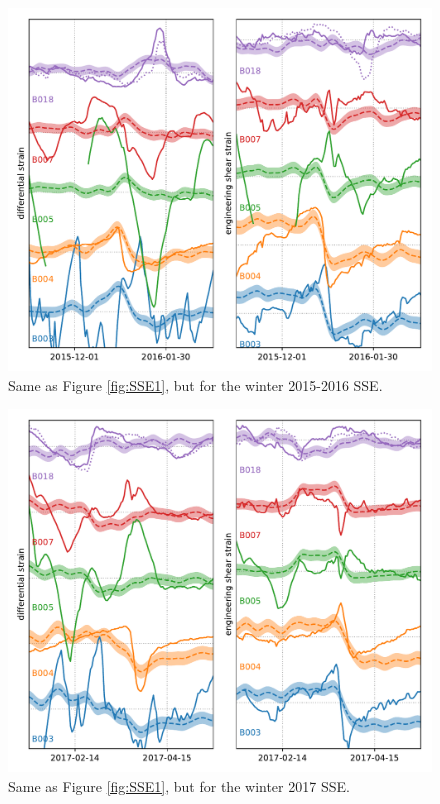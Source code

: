 \documentclass[10pt,a4paper]{article}
\begin{document}
\begin{figure}
\includegraphics{figures/SSE6.pdf}
\caption{Same as Figure \ref{fig:SSE1}, but for the winter 2015-2016 SSE.}   
\label{fig:SSE6}
\end{figure}

\begin{figure}
\includegraphics{figures/SSE7.pdf}
\caption{Same as Figure \ref{fig:SSE1}, but for the winter 2017 SSE.}   
\label{fig:SSE7}
\end{figure}
\end{document}
